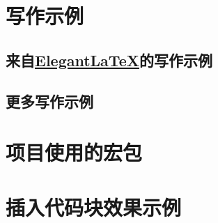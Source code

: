 \documentclass[12pt, textbook, green]{uglyrep}
\begin{document}


\chapter{写作示例}

\section{来自\href{https://github.com/ElegantLaTeX/}{Elegant\LaTeX}的写作示例}


\section{更多写作示例}


\printbibliography[
  title=\ebibname
]

\clearpage
\appendix
\addappheadtotoc
\appendixpage

\chapter{项目使用的宏包}


\chapter{插入代码块效果示例}

\end{document}
